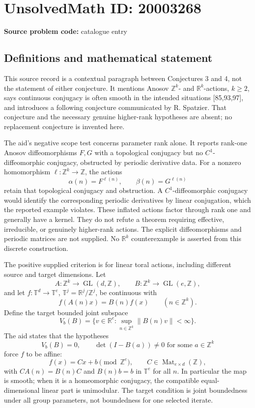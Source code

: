 \documentclass[11pt]{article}
\newcommand{\Z}{\mathbb{Z}}
\newcommand{\R}{\mathbb{R}}
\begin{document}
\section*{UnsolvedMath ID: 20003268}
\textbf{Source problem code:} catalogue entry
\subsection{Definitions and mathematical statement}
This source record is a contextual paragraph between Conjectures 3 and 4, not the statement of either conjecture. It mentions Anosov \(\Z^k\)- and \(\R^k\)-actions, \(k\geq2\), says continuous conjugacy is often smooth in the intended situations [85,93,97], and introduces a following conjecture communicated by R. Spatzier. That conjecture and the necessary genuine higher-rank hypotheses are absent; no replacement conjecture is invented here.

The aid's negative scope test concerns parameter rank alone. It reports rank-one Anosov diffeomorphisms \(F,G\) with a topological conjugacy but no \(C^1\)-diffeomorphic conjugacy, obstructed by periodic derivative data. For a nonzero homomorphism \(\ell:\Z^k\to\Z\), the actions
\[
 \alpha(n)=F^{\ell(n)},\qquad\beta(n)=G^{\ell(n)}
\]
retain that topological conjugacy and obstruction. A \(C^1\)-diffeomorphic conjugacy would identify the corresponding periodic derivatives by linear conjugation, which the reported example violates. These inflated actions factor through rank one and generally have a kernel. They do not refute a theorem requiring effective, irreducible, or genuinely higher-rank actions. The explicit diffeomorphisms and periodic matrices are not supplied. No \(\R^k\) counterexample is asserted from this discrete construction.

The positive supplied criterion is for linear toral actions, including different source and target dimensions. Let
\[
 A:\Z^k\to\operatorname{GL}(d,\Z),\qquad
 B:\Z^k\to\operatorname{GL}(e,\Z),
\]
and let \(f:\mathbb T^d\to\mathbb T^e\), \(\mathbb T^j=\R^j/\Z^j\), be continuous with
\[
 f(A(n)x)=B(n)f(x)\qquad(n\in\Z^k).
\]
Define the target bounded joint subspace
\[
 V_b(B)=\{v\in\R^e:\sup_{n\in\Z^k}\|B(n)v\|<\infty\}.
\]
The aid states that the hypotheses
\[
 V_b(B)=0,\qquad\det(I-B(a))\ne0\text{ for some }a\in\Z^k
\]
force \(f\) to be affine:
\[
 f(x)=Cx+b\pmod{\Z^e},\qquad C\in\operatorname{Mat}_{e\times d}(\Z),
\]
with \(CA(n)=B(n)C\) and \(B(n)b=b\) in \(\mathbb T^e\) for all \(n\). In particular the map is smooth; when it is a homeomorphic conjugacy, the compatible equal-dimensional linear part is unimodular. The target condition is joint boundedness under all group parameters, not boundedness for one selected iterate.
\end{document}
